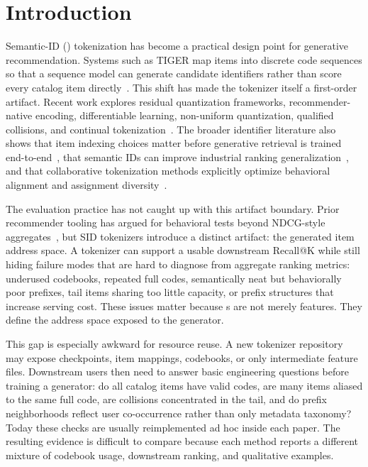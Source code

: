\section{Introduction}

Semantic-ID (\sid) tokenization has become a practical design point for
generative recommendation. Systems such as TIGER map items into discrete code
sequences so that a sequence model can generate candidate identifiers rather
than score every catalog item directly~\cite{rajput2023tiger}. This shift has
made the tokenizer itself a first-order artifact. Recent work explores
residual quantization frameworks, recommender-native encoding, differentiable
\sid learning, non-uniform quantization, qualified collisions, and continual
tokenization~\cite{ju2025grid,liang2026resid,fu2026diger,wei2026card,hu2026quasid,feng2026dact}.
The broader identifier literature also shows that item indexing choices matter
before generative retrieval is trained end-to-end~\cite{hua2023indexids}, that
semantic IDs can improve industrial ranking generalization~\cite{singh2023bettersemanticids},
and that collaborative tokenization methods explicitly optimize behavioral
alignment and assignment diversity~\cite{zhu2024cost,wang2024letter}.

The evaluation practice has not caught up with this artifact boundary. Prior
recommender tooling has argued for behavioral tests beyond NDCG-style
aggregates~\cite{chia2022reclist}, but SID tokenizers introduce a distinct
artifact: the generated item address space. A
tokenizer can support a usable downstream Recall@K while still hiding failure
modes that are hard to diagnose from aggregate ranking metrics: underused
codebooks, repeated full codes, semantically neat but behaviorally poor
prefixes, tail items sharing too little capacity, or prefix structures that
increase serving cost. These issues matter because \sid{}s are not merely
features. They define the address space exposed to the generator.

This gap is especially awkward for resource reuse. A new tokenizer repository
may expose checkpoints, item mappings, codebooks, or only intermediate feature
files. Downstream users then need to answer basic engineering questions before
training a generator: do all catalog items have valid codes, are many items
aliased to the same full code, are collisions concentrated in the tail, and do
prefix neighborhoods reflect user co-occurrence rather than only metadata
taxonomy? Today these checks are usually reimplemented ad hoc inside each
paper. The resulting evidence is difficult to compare because each method
reports a different mixture of codebook usage, downstream ranking, and
qualitative examples.

